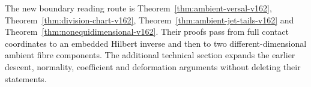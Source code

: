 The new boundary reading route is Theorem~\ref{thm:ambient-versal-v162},
Theorem~\ref{thm:division-chart-v162}, Theorem~\ref{thm:ambient-jet-tails-v162}
and Theorem~\ref{thm:nonequidimensional-v162}. Their proofs pass from
full contact coordinates to an embedded Hilbert inverse and then to
two different-dimensional ambient fibre components. The additional
technical section expands the earlier descent, normality, coefficient
and deformation arguments without deleting their statements.


